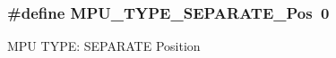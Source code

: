 \subsubsection[{\texorpdfstring{M\+P\+U\+\_\+\+T\+Y\+P\+E\+\_\+\+S\+E\+P\+A\+R\+A\+T\+E\+\_\+\+Pos}{MPU_TYPE_SEPARATE_Pos}}]{\setlength{\rightskip}{0pt plus 5cm}\#define M\+P\+U\+\_\+\+T\+Y\+P\+E\+\_\+\+S\+E\+P\+A\+R\+A\+T\+E\+\_\+\+Pos~0}\hypertarget{group__CMSIS__CM3__MPU_gaa3ef8bc16dfa8b27f80b87109b424fe7}{}\label{group__CMSIS__CM3__MPU_gaa3ef8bc16dfa8b27f80b87109b424fe7}
M\+PU T\+Y\+PE\+: S\+E\+P\+A\+R\+A\+TE Position 